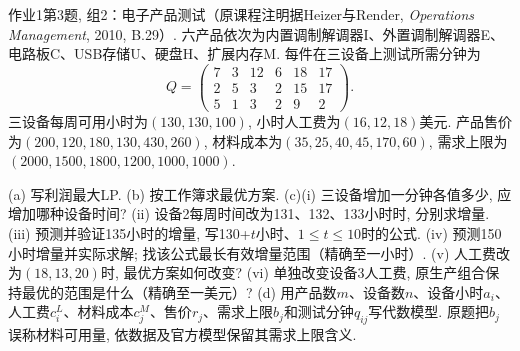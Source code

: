 \begin{exercise}\label{ass:15053-ps1-q3-g2}
作业1第3题, 组2：电子产品测试（原课程注明据Heizer与Render, \emph{Operations Management}, 2010, B.29）. 六产品依次为内置调制解调器I、外置调制解调器E、电路板C、USB存储U、硬盘H、扩展内存M. 每件在三设备上测试所需分钟为
\[
Q=\begin{pmatrix}7&3&12&6&18&17\\2&5&3&2&15&17\\5&1&3&2&9&2\end{pmatrix}.
\]
三设备每周可用小时为$(130,130,100)$, 小时人工费为$(16,12,18)$美元. 产品售价为$(200,120,180,130,430,260)$, 材料成本为$(35,25,40,45,170,60)$, 需求上限为$(2000,1500,1800,1200,1000,1000)$.

(a) 写利润最大LP. (b) 按工作簿求最优方案. (c)(i) 三设备增加一分钟各值多少, 应增加哪种设备时间? (ii) 设备2每周时间改为131、132、133小时时, 分别求增量. (iii) 预测并验证135小时的增量, 写130+$t$小时、$1\le t\le10$时的公式. (iv) 预测150小时增量并实际求解; 找该公式最长有效增量范围（精确至一小时）. (v) 人工费改为$(18,13,20)$时, 最优方案如何改变? (vi) 单独改变设备3人工费, 原生产组合保持最优的范围是什么（精确至一美元）? (d) 用产品数$m$、设备数$n$、设备小时$a_i$、人工费$c_i^L$、材料成本$c_j^M$、售价$r_j$、需求上限$b_j$和测试分钟$q_{ij}$写代数模型. 原题把$b_j$误称材料可用量, 依数据及官方模型保留其需求上限含义.
\end{exercise}
